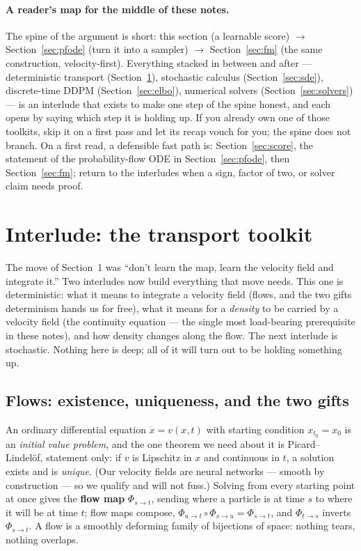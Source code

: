 \documentclass[10pt,a4paper]{article}
\begin{document}
\paragraph{A reader's map for the middle of these notes.}
The spine of the argument is short: this section (a learnable
score) $\to$ Section~\ref{sec:pfode} (turn it into a sampler) $\to$
Section~\ref{sec:fm} (the same construction, velocity-first). Everything
stacked in between and after --- deterministic transport
(Section~\ref{sec:transport}), stochastic calculus
(Section~\ref{sec:sde}), discrete-time DDPM (Section~\ref{sec:elbo}),
numerical solvers (Section~\ref{sec:solvers}) --- is an interlude that
exists to make one step of the spine honest, and each opens by saying
which step it is holding up. If you already own one of those toolkits,
skip it on a first pass and let its recap vouch for you; the spine does
not branch. On a first read, a defensible fast path is:
Section~\ref{sec:score}, the statement of the probability-flow ODE in
Section~\ref{sec:pfode}, then Section~\ref{sec:fm}; return to the
interludes when a sign, factor of two, or solver claim needs proof.

\section{Interlude: the transport toolkit}
\label{sec:transport}

The move of Section~1 was ``don't learn the map, learn the velocity
field and integrate it.'' Two interludes now build everything that move
needs. This one is deterministic: what it means to integrate a velocity
field (flows, and the two gifts determinism hands us for free), what it
means for a \emph{density} to be carried by a velocity field (the
continuity equation --- the single most load-bearing prerequisite in
these notes), and how density changes along the flow. The next interlude
is stochastic. Nothing here is deep; all of it will turn out to be
holding something up.

\subsection{Flows: existence, uniqueness, and the two gifts}
\label{sec:odeflows}

An ordinary differential equation $\dot x = v(x, t)$ with starting
condition $x_{t_0} = x_0$ is an \emph{initial value problem}, and the
one theorem we need about it is Picard--Lindel\"of, statement only: if
$v$ is Lipschitz in $x$ and continuous in $t$, a solution exists and is
\emph{unique}. (Our velocity fields are neural networks --- smooth by
construction --- so we qualify and will not fuss.) Solving from every
starting point at once gives the \textbf{flow map} $\Phi_{s \to t}$,
sending where a particle is at time $s$ to where it will be at time $t$;
flow maps compose, $\Phi_{u \to t} \circ \Phi_{s \to u} = \Phi_{s \to t}$,
and $\Phi_{t \to s}$ inverts $\Phi_{s \to t}$. A flow is a smoothly
deforming family of bijections of space: nothing tears, nothing
overlaps.
\end{document}
